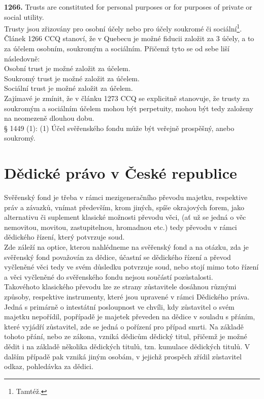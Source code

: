 \documentclass{article}
\begin{document}
\textbf{1266.} Trusts are constituted for personal purposes or for purposes of private or social utility.\\

Trusty jsou zřizovány pro osobní účely nebo pro účely soukromé či sociální\footnote{Tamtéž.}.\\

Článek 1266 CCQ stanoví, že v Quebecu je možné fiducii založit za 3 účely, a to za účelem osobním, soukromým a sociálním. Přičemž tyto se od sebe liší následovně:\\

Osobní trust je možné založit za účelem.\\

Soukromý trust je možné založit za účelem.\\

Sociální trust je možné založit za účelem.\\

Zajímavé je zmínit, že v článku 1273 CCQ se explicitně stanovuje, že trusty za soukromým a sociálním účelem mohou být perpetuity, mohou být tedy založeny na neomezeně dlouhou dobu.\\

§ 1449 (1):
(1) Účel svěřenského fondu může být veřejně prospěšný, anebo soukromý.\\

\newpage
\section{Dědické právo v České republice}

Svěřenský fond je třeba v rámci mezigeneračního převodu majetku, respektive práv a závazků, vnímat především, krom jiných, spíše okrajových forem, jako alternativu či suplement klasické možnosti převodu věci, (ať už se jedná o věc nemovitou, movitou, zastupitelnou, hromadnou etc.) tedy převodu v rámci dědického řízení, který potvrzuje soud.\\

Zde záleží na optice, kterou nahlédneme na svěřenský fond a na otázku, zda je svěřenský fond považován za dědice, účastní se dědického řízení a převod vyčleněné věci tedy ve svém důsledku potvrzuje soud, nebo stojí mimo toto řízení a věci vyčleněné do svěřenského fondu nejsou součástí pozůstalosti.\\

Takovéhoto klasického převodu lze ze strany zůstavitele dosáhnou různými způsoby, respektive instrumenty, které jsou upravené v rámci Dědického práva. Jedná s primárně o intestátní posloupnost ve chvíli, kdy zůstavitel o svém majetku nepořídil, popřípadě je majetek převeden na dědice v souladu s přáním, které vyjádří zůstavitel, zde se jedná o pořízení pro případ smrti. Na základě tohoto přání, nebo ze zákona, vzniká dědicům dědický titul, přičemž je možné dědit i na základě několika dědických titulů, tzn. kumulace dědických titulů. V dalším případě pak vzniká jiným osobám, v jejichž prospěch zřídil zůstavitel odkaz, pohledávka za dědici.\\
\end{document}
